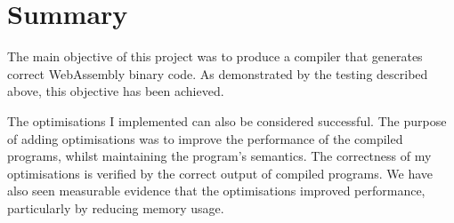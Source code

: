 \documentclass[00-main.tex]{subfiles}
\begin{document}
\section{Summary}

The main objective of this project was to produce a compiler that generates correct WebAssembly binary code.
As demonstrated by the testing described above, this objective has been achieved.

The optimisations I implemented can also be considered successful.
The purpose of adding optimisations was to improve the performance of the compiled programs, whilst maintaining the program's semantics.
The correctness of my optimisations is verified by the correct output of compiled programs.
We have also seen measurable evidence that the optimisations improved performance, particularly by reducing memory usage.
\end{document}
